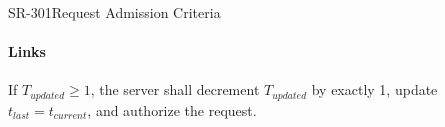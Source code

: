 \begin{softwarerequirement}{SR-301}{Request Admission Criteria}
\paragraph{Links} 

If $T_{updated} \ge 1$,
the server shall decrement $T_{updated}$ by exactly 1, update $t_{last} = t_{current}$,
and authorize the request.
\end{softwarerequirement}